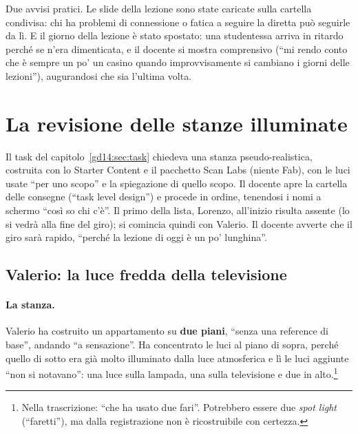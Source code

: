 Due avvisi pratici. Le slide della lezione sono state caricate sulla cartella
condivisa: chi ha problemi di connessione o fatica a seguire la diretta può seguirle
da lì. E il giorno della lezione è stato spostato: una studentessa arriva in ritardo
perché se n'era dimenticata, e il docente si mostra comprensivo (``mi rendo conto che è
sempre un po' un casino quando improvvisamente si cambiano i giorni delle lezioni''),
augurandosi che sia l'ultima volta.

\section{La revisione delle stanze illuminate}
\label{gd17:sec:revisione}

Il task del capitolo~\ref{gd14:sec:task} chiedeva una stanza pseudo-realistica,
costruita con lo Starter Content e il pacchetto Scan Labs (niente Fab), con le luci
usate ``per uno scopo'' e la spiegazione di quello scopo. Il docente apre la cartella
delle consegne (``task level design'') e procede in ordine, tenendosi i nomi a
schermo ``così so chi c'è''. Il primo della lista, Lorenzo, all'inizio risulta
assente (lo si vedrà alla fine del giro); si comincia quindi con Valerio. Il docente
avverte che il giro sarà rapido, ``perché la lezione di oggi è un po' lunghina''.

\subsection{Valerio: la luce fredda della televisione}

\paragraph{La stanza.} Valerio ha costruito un appartamento su \textbf{due piani},
``senza una reference di base'', andando ``a sensazione''. Ha concentrato le luci al
piano di sopra, perché quello di sotto era già molto illuminato dalla luce
atmosferica e lì le luci aggiunte ``non si notavano'': una luce sulla lampada, una
sulla televisione e due in alto.\footnote{Nella trascrizione: ``che ha usato due
fari''. Potrebbero essere due \emph{spot light} (``faretti''), ma dalla registrazione
non è ricostruibile con certezza.}

